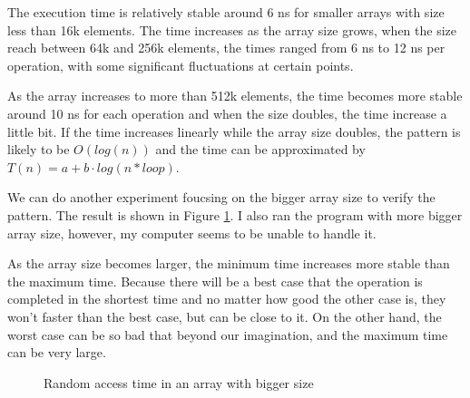 \documentclass[a4paper,11pt]{article}
\begin{document}
The execution time is relatively stable around 6 ns for smaller arrays with size less 
than 16k elements. The time increases as the array size grows, when the size reach between
64k and 256k elements, the times ranged from 6 ns to 12 ns per operation, with some
significant fluctuations at certain points. 

As the array increases to more than 512k elements,
the time becomes more stable around 10 ns for each operation and when the size doubles, the time
increase a little bit. If the time increases linearly while the array size doubles, the pattern is likely
to be $O(log(n))$ and the time can be approximated by $T(n) = a + b \cdot log(n * loop)$. 

We can do another experiment foucsing on the bigger array size to verify the pattern. 
The result is shown in Figure \ref{fig:random_access_big}.
I also ran the program with more bigger array size, however, my computer seems to be unable to handle it.

As the array size becomes larger, the minimum time increases more stable than the maximum time.
Because there will be a best case that the operation is completed in the shortest time and no 
matter how good the other case is, they won't faster than the best case, but can be close to it.
On the other hand, the worst case can be so bad that beyond our imagination, and the maximum time
can be very large.

\begin{figure}[H]
  \centering
  \caption{Random access time in an array with bigger size}
  \label{fig:random_access_big}
\end{figure}
\end{document}
